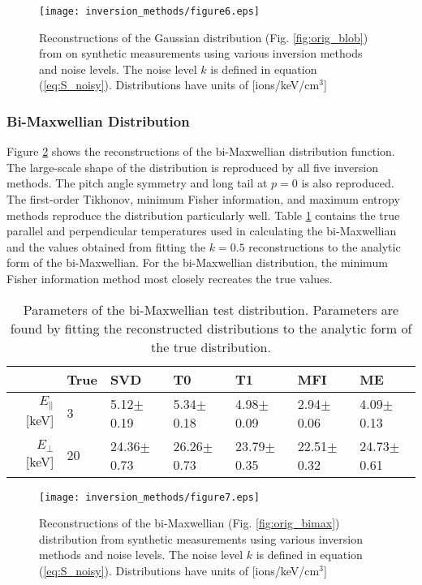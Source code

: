 \begin{figure}[h!]
    \centering
    \texttt{[image: inversion\_methods/figure6.eps]}
    \caption{Reconstructions of the Gaussian distribution (Fig. \ref{fig:orig_blob}) from on synthetic measurements using various inversion methods and noise levels. The noise level $k$ is defined in equation (\ref{eq:S_noisy}). Distributions have units of [ions/keV/cm$^3$] } 
    \label{fig:tomos_blob}
\end{figure}

\subsubsection{Bi-Maxwellian Distribution}
Figure \ref{fig:tomos_bimax} shows the reconstructions of the bi-Maxwellian distribution function. The large-scale shape of the distribution is reproduced by all five inversion methods. The pitch angle symmetry and long tail at $p=0$ is also reproduced.
The first-order Tikhonov, minimum Fisher information, and maximum entropy methods reproduce the distribution particularly well. Table \ref{tab:synthetic_parameters_bimax} contains the true parallel and perpendicular temperatures used in calculating the bi-Maxwellian and the values obtained from fitting the $k=0.5$ reconstructions to the analytic form of the bi-Maxwellian. For the bi-Maxwellian distribution, the minimum Fisher information method most closely recreates the true values.
\begin{table}[h!]
    \caption{\label{tab:synthetic_parameters_bimax} Parameters of the bi-Maxwellian test distribution. Parameters are found by fitting the reconstructed distributions to the analytic form of the true distribution.}
    \begin{tabular}{@{}r|llllll}
     & \textbf{True} & \textbf{SVD} & \textbf{T0} & \textbf{T1} & \textbf{MFI} & \textbf{ME} \\
    \hline\hline
    $E_\parallel$ [keV] & 3 & 5.12$\pm$0.19 & 5.34$\pm$0.18 & 4.98$\pm$0.09 & 2.94$\pm$0.06 & 4.09$\pm$0.13 \\
    $E_\perp$ [keV] & 20 & 24.36$\pm$0.73 & 26.26$\pm$0.73 & 23.79$\pm$0.35 & 22.51$\pm$0.32 & 24.73$\pm$0.61 \\
    \hline
    \end{tabular}
\end{table}
\begin{figure}[h!]
    \centering
    \texttt{[image: inversion\_methods/figure7.eps]}
    \caption{Reconstructions of the bi-Maxwellian (Fig. \ref{fig:orig_bimax}) distribution from synthetic measurements using various inversion methods and noise levels. The noise level $k$ is defined in equation (\ref{eq:S_noisy}). Distributions have units of [ions/keV/cm$^3$] }
    \label{fig:tomos_bimax}
\end{figure}

